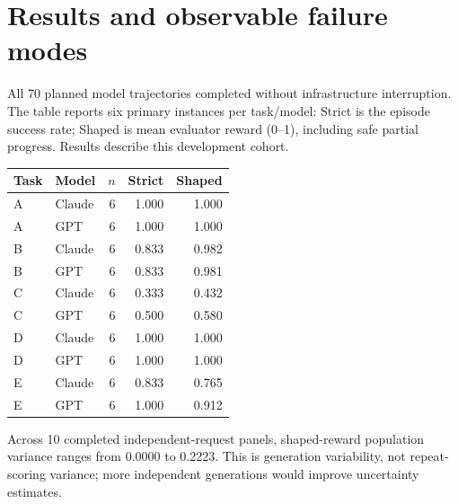 \section{Results and observable failure modes}

All 70 planned model trajectories completed without infrastructure interruption. The table reports six primary instances per task/model: Strict is the episode success rate; Shaped is mean evaluator reward (0--1), including safe partial progress. Results describe this development cohort.

\begin{center}\small

\begin{tabular}{llrrr}\toprule

Task & Model & $n$ & Strict & Shaped \\ \midrule

A & Claude & 6 & 1.000 & 1.000 \\

A & GPT & 6 & 1.000 & 1.000 \\

B & Claude & 6 & 0.833 & 0.982 \\

B & GPT & 6 & 0.833 & 0.981 \\

C & Claude & 6 & 0.333 & 0.432 \\

C & GPT & 6 & 0.500 & 0.580 \\

D & Claude & 6 & 1.000 & 1.000 \\

D & GPT & 6 & 1.000 & 1.000 \\

E & Claude & 6 & 0.833 & 0.765 \\

E & GPT & 6 & 1.000 & 0.912 \\

\bottomrule\end{tabular}\end{center}

Across 10 completed independent-request panels, shaped-reward population variance ranges from 0.0000 to 0.2223. This is generation variability, not repeat-scoring variance; more independent generations would improve uncertainty estimates.

